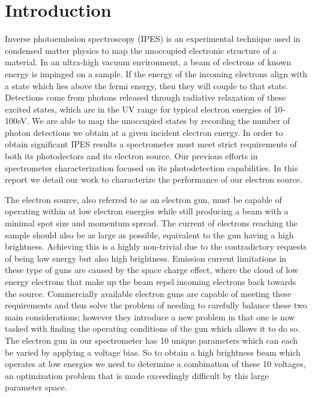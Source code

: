 \section{Introduction}
    Inverse photoemission spectroscopy (IPES) is an experimental technique used in condensed matter physics to map the unoccupied electronic structure
    of a material. In an ultra-high vacuum environment, a beam of electrons of known energy is impinged on a sample. If the energy of the incoming
    electrons align with a state which lies above the fermi energy, then they will couple to that state. Detections come from photons released through
    radiative relaxation of these excited states, which are in the UV range for typical electron energies of 10-100eV. We are able to map the unoccupied states
    by recording the number of photon detections we obtain at a given incident electron energy. In order to obtain significant IPES results a spectrometer must meet strict requirements of both its photodectors and its electron source. Our previous efforts in 
    spectrometer characterization focused on its photodetection capabilities. In this report we detail our work to characterize the performance 
    of our electron source.

    The electron source, also referred to as an electron gun, must be capable of operating within at low electron energies while still producing a beam with a minimal spot size and 
    momentum spread. The current of electrons reaching the sample should also be as large as possible, equivalent to the gun having a high brightness. Achieving this is a highly 
    non-trivial due to the contradictory requests of being low energy but also high brightness\cite{stoffel1985low}. Emission current limitations in these type of guns are caused by the space charge effect, 
    where the cloud of low energy electrons that make up the beam repel incoming electrons back towards the source\cite{staib}. Commercially available 
    electron guns are capable of meeting these requirements and thus solve the problem of needing to carefully balance these two main considerations; however they introduce a 
    new problem in that one is now tasked with finding the operating conditions of the gun which allows it to do so. The electron gun in our spectrometer has 10 unique parameters
    which can each be varied by applying a voltage bias. So to obtain a high brightness beam which operates at low energies we need to determine a combination of these 10 
    voltages, an optimization problem that is made exceedingly difficult by this large parameter space. 

